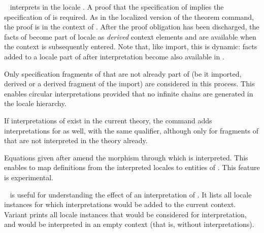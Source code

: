 \begin{isabellebody}
\begin{isamarkuptext}
\begin{description}
  \item \hyperlink{command.sublocale}{\mbox{}}~
  interprets  in the locale .  A proof that
  the specification of  implies the specification of
   is required.  As in the localized version of the
  theorem command, the proof is in the context of .  After
  the proof obligation has been discharged, the facts of 
  become part of locale  as \emph{derived} context
  elements and are available when the context  is
  subsequently entered.  Note that, like import, this is dynamic:
  facts added to a locale part of  after interpretation
  become also available in .

  Only specification fragments of  that are not already
  part of  (be it imported, derived or a derived fragment
  of the import) are considered in this process.  This enables
  circular interpretations provided that no infinite chains are
  generated in the locale hierarchy.

  If interpretations of  exist in the current theory, the
  command adds interpretations for  as well, with the same
  qualifier, although only for fragments of  that are not
  interpreted in the theory already.

  Equations given after \hyperlink{keyword.where}{\mbox{}} amend the morphism through
  which  is interpreted.  This enables to map definitions
  from the interpreted locales to entities of .  This
  feature is experimental.

  \item \hyperlink{command.print-dependencies}{\mbox{}}~ is useful for
  understanding the effect of an interpretation of .  It
  lists all locale instances for which interpretations would be added
  to the current context.  Variant \hyperlink{command.print-dependencies}{\mbox{}} prints all locale instances that
  would be considered for interpretation, and would be interpreted in
  an empty context (that is, without interpretations).


\end{description}
\end{isamarkuptext}
\end{isabellebody}
